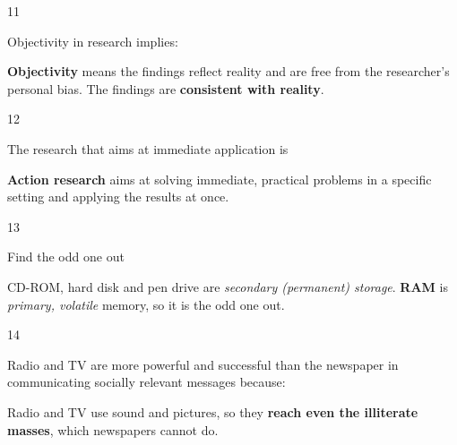 \begin{question}{11}
{Objectivity in research implies:\par}
\begin{explain}
\textbf{Objectivity} means the findings reflect reality and are free from the researcher's personal bias. The findings are \textbf{consistent with reality}.
\end{explain}
\end{question}

\begin{question}{12}
{The research that aims at immediate application is\par}
\begin{explain}
\textbf{Action research} aims at solving immediate, practical problems in a specific setting and applying the results at once.
\end{explain}
\end{question}

\begin{question}{13}
{Find the odd one out\par}
\begin{explain}
CD-ROM, hard disk and pen drive are \emph{secondary (permanent) storage}. \textbf{RAM} is \emph{primary, volatile} memory, so it is the odd one out.
\end{explain}
\end{question}

\begin{question}{14}
{Radio and TV are more powerful and successful than the newspaper in communicating socially relevant messages because:\par}
\begin{explain}
Radio and TV use sound and pictures, so they \textbf{reach even the illiterate masses}, which newspapers cannot do.
\end{explain}
\end{question}

